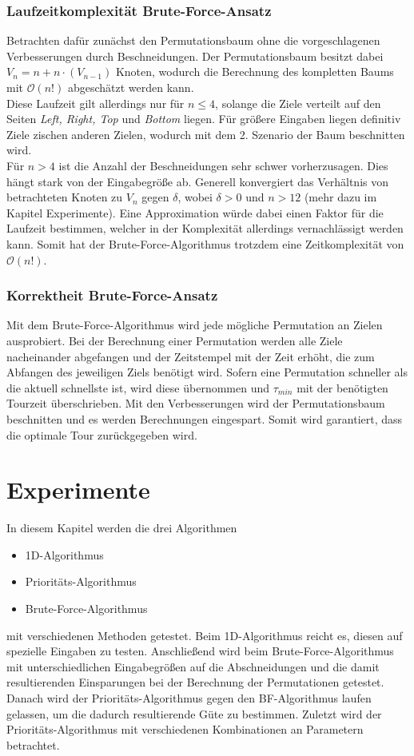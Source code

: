 \documentclass[german,version-2019-11]{uzl-thesis}
\begin{document}
\subsection{Laufzeitkomplexität Brute-Force-Ansatz}
Betrachten dafür zunächst den Permutationsbaum ohne die vorgeschlagenen Verbesserungen durch Beschneidungen. Der Permutationsbaum besitzt dabei $V_n = n + n\cdot (V_{n-1})$ Knoten, wodurch die Berechnung des kompletten Baums mit $\mathcal{O}(n!)$ abgeschätzt werden kann. \\
Diese Laufzeit gilt allerdings nur für $n\leq 4$, solange die Ziele verteilt auf den Seiten \emph{Left, Right, Top} und \emph{Bottom} liegen. Für größere Eingaben liegen definitiv Ziele zischen anderen Zielen, wodurch mit dem 2. Szenario der Baum beschnitten wird. \\
Für $n>4$ ist die Anzahl der Beschneidungen sehr schwer vorherzusagen. Dies hängt stark von der Eingabegröße ab. Generell konvergiert das Verhältnis von betrachteten Knoten zu $V_n$ gegen $\delta$, wobei $\delta>0$ und $n>12$ (mehr dazu im Kapitel Experimente). Eine Approximation würde dabei einen Faktor für die Laufzeit bestimmen, welcher in der Komplexität allerdings vernachlässigt werden kann. Somit hat der Brute-Force-Algorithmus trotzdem eine Zeitkomplexität von $\mathcal{O}(n!)$.

\subsection{Korrektheit Brute-Force-Ansatz}
Mit dem Brute-Force-Algorithmus wird jede mögliche Permutation an Zielen ausprobiert. Bei der Berechnung einer Permutation werden alle Ziele nacheinander abgefangen und der Zeitstempel mit der Zeit erhöht, die zum Abfangen des jeweiligen Ziels benötigt wird. Sofern eine Permutation schneller als die aktuell schnellste ist, wird diese übernommen und $\tau_{min}$ mit der benötigten Tourzeit überschrieben. Mit den Verbesserungen wird der Permutationsbaum beschnitten und es werden Berechnungen eingespart. Somit wird garantiert, dass die optimale Tour zurückgegeben wird.


\chapter{Experimente}
\label{kap5}
In diesem Kapitel werden die drei Algorithmen
\begin{itemize}
\item 1D-Algorithmus
\item Prioritäts-Algorithmus
\item Brute-Force-Algorithmus
\end{itemize}
mit verschiedenen Methoden getestet. Beim 1D-Algorithmus reicht es, diesen auf spezielle Eingaben zu testen. Anschließend wird beim Brute-Force-Algorithmus mit unterschiedlichen Eingabegrößen auf die Abschneidungen und die damit resultierenden Einsparungen bei der Berechnung der Permutationen getestet. Danach wird der Prioritäts-Algorithmus gegen den BF-Algorithmus laufen gelassen, um die dadurch resultierende Güte zu bestimmen. Zuletzt wird der Prioritäts-Algorithmus mit verschiedenen Kombinationen an Parametern betrachtet. 
\end{document}
